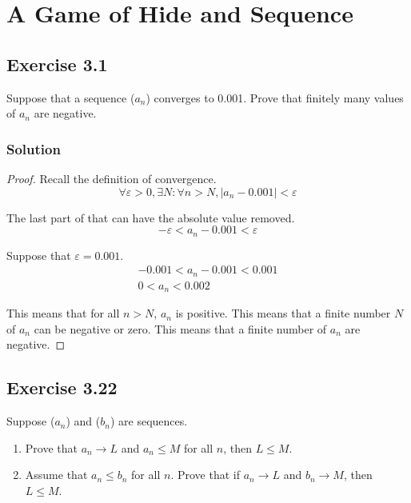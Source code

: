\documentclass[12pt]{report}
\begin{document}
\renewcommand\qedsymbol{OE$\Delta$}
\newcommand{\abs}[1]{\left| #1 \right|}
\newcommand{\mathif}{\text{if }}
\newcommand{\seq}[2][n]{\ensuremath{(#2 _{#1})}}

\tableofcontents
\pagebreak

\setcounter{chapter}{2}
\chapter{A Game of Hide and Sequence}

\section{Exercise 3.1}
    Suppose that a sequence ($a_n$) converges to 0.001. 
    Prove that finitely many values of $a_n$ are negative. 

    \subsection{Solution}
        \begin{proof}
            Recall the definition of convergence.
            \begin{equation}
                \forall \varepsilon > 0, \exists N : \forall n > N, \left| a_n - 0.001 \right| < \varepsilon
            \end{equation}

            The last part of that can have the absolute value removed.
            \begin{equation}
                -\varepsilon < a_n - 0.001 < \varepsilon
            \end{equation}

            Suppose that $\varepsilon = 0.001$.
            \begin{gather}
                -0.001 < a_n - 0.001 < 0.001\\
                0 < a_n < 0.002
            \end{gather}

            This means that for all $n > N$, $a_n$ is positive.
            This means that a finite number $N$ of $a_n$ can be negative or zero.
            This means that a finite number of $a_n$ are negative.
        \end{proof}    
    \pagebreak
    
\section{Exercise 3.22}
    Suppose ($a_n$) and ($b_n$) are sequences.
    \begin{enumerate}[label=(\alph*)]
        \item   Prove that $a_n \to L$ and $a_n \leq M$ for all $n$, then $L \leq M$.
        \item   Assume that $a_n \leq b_n$ for all $n$. Prove that if $a_n \to L$ and $b_n \to M$, then $L \leq M$.
    \end{enumerate}
\end{document}
